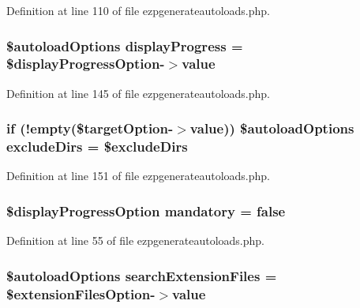 \-Definition at line 110 of file ezpgenerateautoloads.\-php.

\hypertarget{ezpgenerateautoloads_8php_aa79f55582aba2bd3eff4d3fa4b980a84}{
\subsubsection[{display\-Progress}]{\setlength{\rightskip}{0pt plus 5cm}\$autoload\-Options {\bf display\-Progress} = \$display\-Progress\-Option-\/$>$value}}\label{ezpgenerateautoloads_8php_aa79f55582aba2bd3eff4d3fa4b980a84}


\-Definition at line 145 of file ezpgenerateautoloads.\-php.

\hypertarget{ezpgenerateautoloads_8php_a52217447e9aa7d329a16ea69370b42a4}{
\subsubsection[{exclude\-Dirs}]{\setlength{\rightskip}{0pt plus 5cm}if (!empty(\$target\-Option-\/$>$value)) \$autoload\-Options {\bf exclude\-Dirs} = \${\bf exclude\-Dirs}}}\label{ezpgenerateautoloads_8php_a52217447e9aa7d329a16ea69370b42a4}


\-Definition at line 151 of file ezpgenerateautoloads.\-php.

\hypertarget{ezpgenerateautoloads_8php_ac38115d855b4d48735ec865ab62bf1fe}{
\subsubsection[{mandatory}]{\setlength{\rightskip}{0pt plus 5cm}\$display\-Progress\-Option {\bf mandatory} = false}}\label{ezpgenerateautoloads_8php_ac38115d855b4d48735ec865ab62bf1fe}


\-Definition at line 55 of file ezpgenerateautoloads.\-php.

\hypertarget{ezpgenerateautoloads_8php_ae648f5335e57fa264ffaaf9d2fe4c61b}{
\subsubsection[{search\-Extension\-Files}]{\setlength{\rightskip}{0pt plus 5cm}\$autoload\-Options {\bf search\-Extension\-Files} = \$extension\-Files\-Option-\/$>$value}}\label{ezpgenerateautoloads_8php_ae648f5335e57fa264ffaaf9d2fe4c61b}


